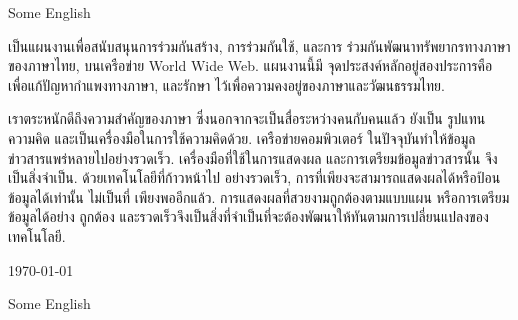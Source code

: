 \documentclass[a4paper]{article}
\begin{document}
Some English
\bigskip

\begin{thai}
เป็น\wbr แผนงานเพื่อ\wbr สนับสนุน\wbr การ\wbr ร่วมกัน\wbr สร้าง, การ\wbr ร่วมกันใช้, และ\wbr การ%
ร่วมกัน\wbr พัฒนา\wbr ทรัพยากร\wbr ทาง\wbr ภาษา\wbr ของ\wbr ภาษา\wbr ไทย, บน\wbr เครือข่าย World Wide Web. แผนงานนี้\wbr มี%
จุด\wbr ประสงค์หลั\wbr กอยู่\wbr สอง\wbr ประการคือ เพื่อแก้ปัญหา\wbr กำ\wbr แพง\wbr ทาง\wbr ภาษา, และรักษา%
ไว้เพื่อ\wbr ความค\wbr งอยู่\wbr ของ\wbr ภาษา\wbr และ\wbr วัฒนธรรม\wbr ไทย.

เรา\wbr ตระหนัก\wbr ดีถึง\wbr ความ\wbr สำคัญ\wbr ของ\wbr ภาษา ซึ่ง\wbr นอกจาก\wbr จะ\wbr เป็นสื่อ\wbr ระหว่าง\wbr คนกับ\wbr คน\wbr แล้ว ยัง\wbr เป็น%
รูปแทน\wbr ความคิด และ\wbr เป็น\wbr เครื่องมือ\wbr ใน\wbr การใช้\wbr ความคิด\wbr ด้วย. เครือข่าย\wbr คอมพิวเตอร์%
ใน\wbr ปัจจุบัน\wbr ทำให้ข้อมูล\wbr ข่าวสาร\wbr แพร่หลาย\wbr ไป\wbr อย่าง\wbr รวดเร็ว. เครื่องมือที่ใช้\wbr ใน\wbr การแส\wbr ดง\wbr ผล%
และ\wbr การเต\wbr รี\wbr ยมข้อมูล\wbr ข่าวสาร\wbr นั้น จึง\wbr เป็นสิ่ง\wbr จำ\wbr เป็น. ด้วย\wbr เทคโนโลยีที่\wbr ก้าวหน้า\wbr ไป%
อย่าง\wbr รวดเร็ว, การที่\wbr เพียง\wbr จะ\wbr สามารถแส\wbr ดง\wbr ผลได้หรือ\wbr ป้อนข้อมูลได้\wbr เท่านั้น ไม่\wbr เป็นที่%
เพียงพออีก\wbr แล้ว. การแส\wbr ดง\wbr ผลที่\wbr สวย\wbr งาม\wbr ถูก\wbr ต้อง\wbr ตาม\wbr แบบแผน หรือ\wbr การเต\wbr รี\wbr ยมข้อมูลได้\wbr อย่าง%
ถูก\wbr ต้อง และ\wbr รวดเร็วจึง\wbr เป็นสิ่งที่\wbr จำ\wbr เป็นที่\wbr จะ\wbr ต้อง\wbr พัฒนาให้\wbr ทันตาม\wbr การ\wbr เปลี่ยนแปลง\wbr ของ%
เทคโนโลยี.

\today
\end{thai}

Some English
\bigskip
\end{document}
